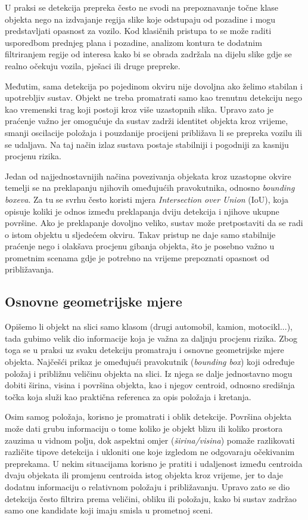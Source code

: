 U praksi se detekcija prepreka često ne svodi na prepoznavanje točne klase objekta nego na izdvajanje regija slike koje odstupaju od pozadine i mogu predstavljati opasnost za vozilo. Kod klasičnih pristupa to se može raditi usporedbom prednjeg plana i pozadine, analizom kontura te dodatnim filtriranjem regije od interesa kako bi se obrada zadržala na dijelu slike gdje se realno očekuju vozila, pješaci ili druge prepreke.

Međutim, sama detekcija po pojedinom okviru nije dovoljna ako želimo stabilan i upotrebljiv sustav. Objekt ne treba promatrati samo kao trenutnu detekciju nego kao vremenski trag koji postoji kroz više uzastopnih slika. Upravo zato je praćenje važno jer omogućuje da sustav zadrži identitet objekta kroz vrijeme, smanji oscilacije položaja i pouzdanije procijeni približava li se prepreka vozilu ili se udaljava. Na taj način izlaz sustava postaje stabilniji i pogodniji za kasniju procjenu rizika.

Jedan od najjednostavnijih načina povezivanja objekata kroz uzastopne okvire temelji se na preklapanju njihovih omeđujućih pravokutnika, odnosno \textit{bounding boxeva}. Za tu se svrhu često koristi mjera \textit{Intersection over Union} (IoU), koja opisuje koliki je odnos između preklapanja dviju detekcija i njihove ukupne površine. Ako je preklapanje dovoljno veliko, sustav može pretpostaviti da se radi o istom objektu u sljedećem okviru. Takav pristup ne daje samo stabilnije praćenje nego i olakšava procjenu gibanja objekta, što je posebno važno u prometnim scenama gdje je potrebno na vrijeme prepoznati opasnost od približavanja.

\subsection{Osnovne geometrijske mjere}
Opišemo li objekt na slici samo klasom (drugi automobil, kamion, motocikl...), tada gubimo velik dio informacije koja je važna za daljnju procjenu rizika. Zbog toga se u praksi uz svaku detekciju promatraju i osnovne geometrijske mjere objekta. Najčešći prikaz je omeđujući pravokutnik (\textit{bounding box}) koji određuje položaj i približnu veličinu objekta na slici. Iz njega se dalje jednostavno mogu dobiti širina, visina i površina objekta, kao i njegov centroid, odnosno središnja točka koja služi kao praktična referenca za opis položaja i kretanja.

Osim samog položaja, korisno je promatrati i oblik detekcije. Površina objekta može dati grubu informaciju o tome koliko je objekt blizu ili koliko prostora zauzima u vidnom polju, dok aspektni omjer (\textit{širina/visina}) pomaže razlikovati različite tipove detekcija i ukloniti one koje izgledom ne odgovaraju očekivanim preprekama. U nekim situacijama korisno je pratiti i udaljenost između centroida dvaju objekata ili promjenu centroida istog objekta kroz vrijeme, jer to daje dodatnu informaciju o relativnom položaju i približavanju. Upravo zato se dio detekcija često filtrira prema veličini, obliku ili položaju, kako bi sustav zadržao samo one kandidate koji imaju smisla u prometnoj sceni.

